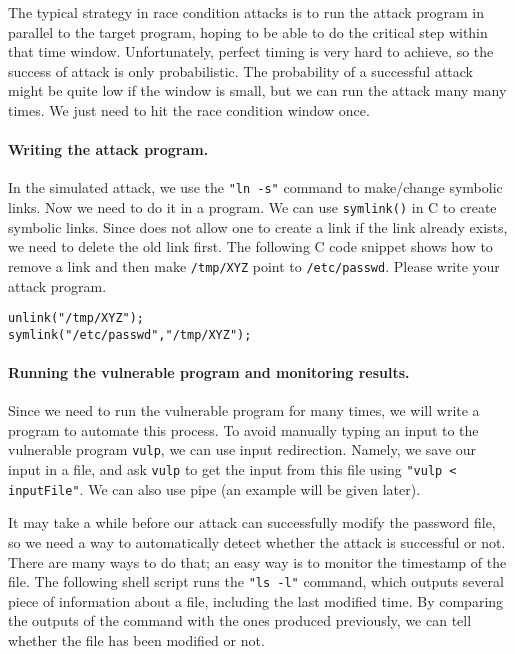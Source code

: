 The typical strategy in race condition attacks is to run the attack
program in parallel to the target program, 
hoping to be able to do the critical step within that time window.
Unfortunately, perfect timing is very hard to achieve, so 
the success of attack is only probabilistic.
The probability of a successful attack might be quite low if the window
is small, but we can run the attack many many times. 
We just need to hit the race condition window once.  


\paragraph{Writing the attack program.} In the simulated attack,
we use the \texttt{"ln -s"} command to make/change symbolic links.
Now we need to do it in a program.
We can use {\tt symlink()} in C to create symbolic links.
Since \linux does not allow one to create a link if the link already exists,
we need to delete the old link first.
The following C code snippet shows how to remove a link and then make
{\tt /tmp/XYZ} point to {\tt /etc/passwd}. Please write your attack 
program.

\begin{lstlisting}
unlink("/tmp/XYZ");
symlink("/etc/passwd","/tmp/XYZ");
\end{lstlisting}



\paragraph{Running the vulnerable program and monitoring results.}
Since we need to run the vulnerable program for many
times, we will write a program to automate this process. 
To avoid manually typing an input to the vulnerable program \texttt{vulp}, 
we can use input redirection. Namely, we save our input in a file, and ask
\texttt{vulp} to get the input from this file using \texttt{"vulp <
inputFile"}. We can also use pipe (an example will be given later). 

It may take a while before our attack can successfully modify the
password file, so we need a way to automatically detect whether the attack is
successful or not. There are many ways to do that; an easy way 
is to monitor the timestamp of the file.
The following shell script runs the \texttt{"ls -l"} command, which
outputs several piece of information about a
file, including the last modified time. By comparing the outputs of the
command with the ones produced previously, we can tell
whether the file has been modified or not. 

